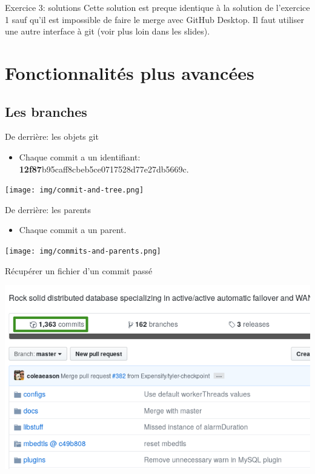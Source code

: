 \documentclass{beamer}
\begin{document}
\begin{frame}{Exercice 3: solutions}
    Cette solution est preque identique à la solution de l'exercice 1 sauf
    qu'il est impossible de faire le merge avec GitHub Desktop. Il faut
    utiliser une autre interface à git (voir plus loin dans les slides).
\end{frame}

\section{Fonctionnalités plus avancées}

\subsection{Les branches}

\begin{frame}{De derrière: les objets git}
    \begin{itemize}
        \item Chaque commit a un identifiant: \textbf{12f87}b95caff8cbeb5ce0717528d77e27db5669c.
    \end{itemize}
    \begin{center}
    \texttt{[image: img/commit-and-tree.png]}
    \end{center}
\end{frame}

\begin{frame}{De derrière: les parents}
    \begin{itemize}
        \item Chaque commit a un parent.
    \end{itemize}
    \texttt{[image: img/commits-and-parents.png]}
\end{frame}

\begin{frame}{Récupérer un fichier d'un commit passé}
    \begin{center}
    	\includegraphics[scale=0.5]{img/rollback_1.png}
    \end{center}
\end{frame}
\end{document}
